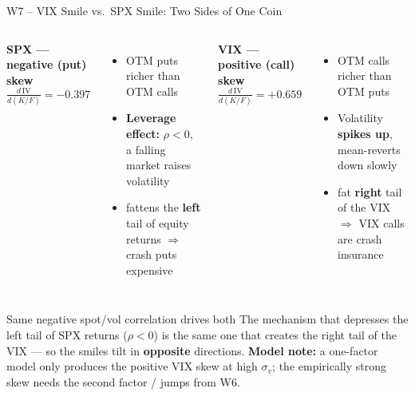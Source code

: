 \documentclass[aspectratio=169, 11pt]{beamer}
\begin{document}
\begin{frame}{W7 -- VIX Smile vs.\ SPX Smile: Two Sides of One Coin}

\begin{columns}[T]
\textbf{SPX --- negative (put) skew}
\[
  \tfrac{d\,\mathrm{IV}}{d(K/F)} = \mathbf{-0.397}
\]
\begin{itemize}\small
  \item OTM puts richer than OTM calls
  \item \textbf{Leverage effect:} $\rho < 0$, a falling market raises volatility
  \item fattens the \textbf{left} tail of equity returns $\Rightarrow$ crash puts expensive
\end{itemize}

\textbf{VIX --- positive (call) skew}
\[
  \tfrac{d\,\mathrm{IV}}{d(K/F)} = \mathbf{+0.659}
\]
\begin{itemize}\small
  \item OTM calls richer than OTM puts
  \item Volatility \textbf{spikes up}, mean-reverts down slowly
  \item fat \textbf{right} tail of the VIX $\Rightarrow$ VIX calls are crash insurance
\end{itemize}
\end{columns}

\vspace{6pt}
\begin{block}{Same negative spot/vol correlation drives both}
\small
The mechanism that depresses the left tail of SPX returns ($\rho<0$) is the same one
that creates the right tail of the VIX --- so the smiles tilt in \textbf{opposite}
directions. \textbf{Model note:} a one-factor model only produces the positive VIX skew
at high $\sigma_v$; the empirically strong skew needs the second factor / jumps from W6.
\end{block}
\end{frame}
\end{document}
